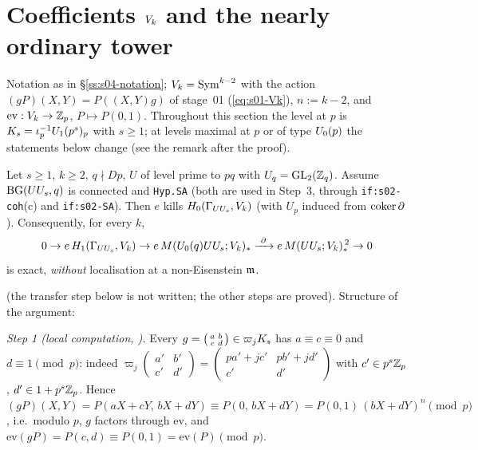 \section{Coefficients \texorpdfstring{$V_k$}{V k} and the nearly ordinary tower}

Notation as in \S\ref{ss:s04-notation}; $V_k=\mathrm{Sym}^{k-2}$ with the action $(gP)(X,Y)=P((X,Y)g)$ of stage~01 (\eqref{eq:s01-Vk}),
$n:=k-2$, and $\mathrm{ev}:V_k\to\mathbb{Z}_p$, $P\mapsto P(0,1)$. Throughout this section the level at $p$ is $K_{s}=\iota_p^{-1}U_1(p^s)_p$
with $s\ge1$; at levels maximal at $p$ or of type $U_0(p)$ the statements below change (see the remark after the proof).

\begin{proposition}\label{prop:s04-ekillsVk}
Let $s\ge1$, $k\ge2$, $q\nmid Dp$, $U$ of level prime to $pq$ with $U_q=\mathrm{GL}_2(\mathbb{Z}_q)$. Assume $\mathrm{BG}(UU_s,q)$ is connected and \texttt{Hyp.SA}
(both are used in Step~3, through \texttt{if:s02-coh}(c) and \texttt{if:s02-SA}). Then $e$ kills $H_0(\Gamma_{UU_s},V_k)$ (with
$U_p$ induced from $\operatorname{coker}\partial$). Consequently, for every $k$,
\[0\to e\,H_1(\Gamma_{UU_s},\Vk)\to e\,\Brandt{\Uzero{q}UU_s}{\Vk}_*\xrightarrow{\ \partial\ }e\,\Brandt{UU_s}{\Vk}_*^{\,2}\to0\]
is exact, \emph{without} localisation at a non-Eisenstein $\mathfrak{m}$.
\end{proposition}
\noindent\sttoprove{} (the transfer step below is not written; the other steps are proved). Structure of the argument:

\emph{Step 1 (local computation, \stproved).} Every $g=\left(\begin{smallmatrix}a&b\\c&d\end{smallmatrix}\right)\in\varpi_jK_{s}$
has $a\equiv c\equiv0$ and $d\equiv1\pmod p$: indeed $\varpi_j\left(\begin{smallmatrix}a'&b'\\c'&d'\end{smallmatrix}\right)=
\left(\begin{smallmatrix}pa'+jc'&pb'+jd'\\c'&d'\end{smallmatrix}\right)$ with $c'\in p^s\mathbb{Z}_p$, $d'\in1+p^s\mathbb{Z}_p$. Hence
$(gP)(X,Y)=P(aX+cY,\,bX+dY)\equiv P(0,\,bX+dY)=P(0,1)\,(bX+dY)^n\pmod p$, i.e.\ modulo $p$, $g$ factors through $\mathrm{ev}$, and
$\mathrm{ev}(gP)=P(c,d)\equiv P(0,1)=\mathrm{ev}(P)\pmod p$.

